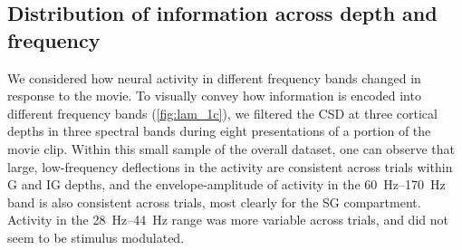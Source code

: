 \subsection{Distribution of information across depth and frequency}

We considered how neural activity in different frequency bands changed in response to the movie.
To visually convey how information is encoded into different frequency bands (\autoref{fig:lam_1c}), we filtered the \ac{CSD} at three cortical depths in three spectral bands during eight presentations of a portion of the movie clip.
Within this small sample of the overall dataset, one can observe that large, low-frequency deflections in the activity are consistent across trials within \ac{G} and \ac{IG} depths, and the envelope-amplitude of activity in the \SIrange{60}{170}{Hz} band is also consistent across trials, most clearly for the \ac{SG} compartment.
Activity in the \SIrange{28}{44}{Hz} range was more variable across trials, and did not seem to be stimulus modulated.


